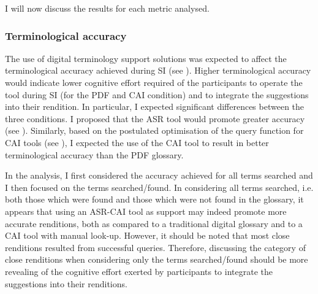 I will now discuss the results for each metric analysed.

\subsubsection{Terminological accuracy}	\label{termaccdisc}
The use of digital terminology support solutions was expected to affect the terminological accuracy achieved during SI (see ). Higher terminological accuracy would indicate lower cognitive effort required of the participants to operate the tool during SI (for the PDF and CAI condition) and to integrate the suggestions into their rendition. In particular, I expected significant differences between the three conditions. I proposed that the ASR tool would promote greater accuracy (see ). Similarly, based on the postulated optimisation of the query function for CAI tools (see ), I expected the use of the CAI tool to result in better terminological accuracy than the PDF glossary.

\begin{sloppypar}
In the analysis, I first considered the accuracy achieved for all terms searched and I then focused on the terms searched/found. In considering all terms searched, i.e. both those which were found and those which were not found in the glossary, it appears that using an ASR-CAI tool as support may indeed promote more accurate renditions, both as compared to a traditional digital glossary and to a CAI tool with manual look-up. However, it should be noted that most close renditions resulted from successful queries. Therefore, discussing the category of close renditions when considering only the terms searched/found should be more revealing of the cognitive effort exerted by participants to integrate the suggestions into their renditions.
\end{sloppypar}

